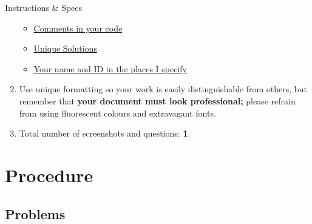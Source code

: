 \begin{step}{Instructions \& Specs}
\begin{enumerate}
            \begin{itemize}
            
            \item \underline{Comments in your code} 
            
            \item \underline{Unique Solutions}
            
            \item \underline{Your name and ID in the places I specify}
                
            \end{itemize}
            
        \item Use unique formatting so your work is easily distinguishable from others, but remember that \textbf{\textcolor{NordOrange}{your document must look professional};} please refrain from using fluorescent colours and extravagant fonts. 

        \item Total number of screenshots and questions: \textbf{\textcolor{NordRed}{1}}.

    \end{enumerate}
    
\end{step}

\section{Procedure}

\subsection{Problems}

